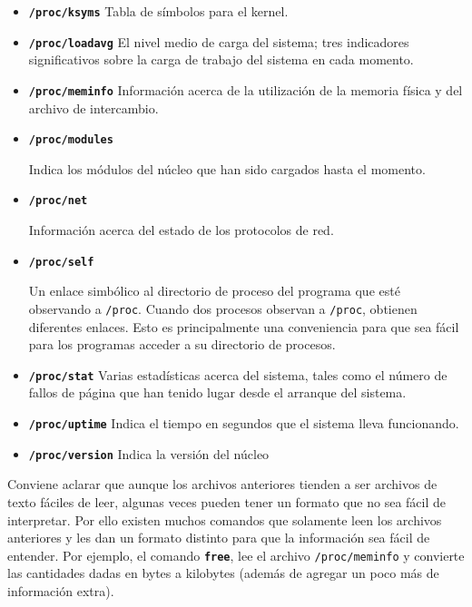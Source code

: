 \begin{itemize}
	

	\item 

	\textbf{\texttt{/proc/ksyms}}
	 Tabla de símbolos para el
	kernel.
	
	\item \textbf{\texttt{/proc/loadavg}}
	 El nivel medio de carga del sistema; tres indicadores
	significativos sobre la carga de trabajo del sistema en cada
	momento.
	
	\item \textbf{\texttt{/proc/meminfo}}
	 Información acerca de la utilización de la memoria
	física y 	del archivo de
	intercambio.
	
	\item
	
	\textbf{\texttt{/proc/modules}}
	
	 Indica los módulos del núcleo que han sido cargados
	hasta el 	momento.
	

	\item \textbf{\texttt{/proc/net}}         
    
	 Información acerca del estado de los protocolos de
	red.
	
	\item
	
	\textbf{\texttt{/proc/self}}
	
	 Un enlace simbólico al directorio de proceso del
	programa que esté observando a \texttt{/proc}. Cuando dos
	procesos observan a \texttt{/proc}, obtienen diferentes
	enlaces. Esto es principalmente una conveniencia para que sea fácil para
	los programas acceder a su directorio de
	procesos.
	
	\item \textbf{\texttt{/proc/stat}}
	 Varias estadísticas acerca del sistema, tales como el
	número de fallos de página que han tenido lugar desde el arranque del
	sistema.
	
	\item \textbf{\texttt{/proc/uptime}}
	 Indica el tiempo en segundos que el sistema lleva
	funcionando.
	
	\item \textbf{\texttt{/proc/version}}
	 Indica la versión del núcleo
	
	
	 \end{itemize} 

    Conviene aclarar que aunque los archivos anteriores tienden a ser
    archivos de texto fáciles de leer, algunas veces pueden tener un formato
    que no sea fácil de interpretar. Por ello existen muchos comandos que
    solamente leen los archivos anteriores y les dan un formato distinto para
    que la información sea fácil de entender. Por ejemplo, el comando
    \texttt{\textbf{free}}, lee el archivo \texttt{/proc/meminfo}
    y convierte las cantidades dadas en bytes a kilobytes (además de agregar un
    poco más de información extra). 









